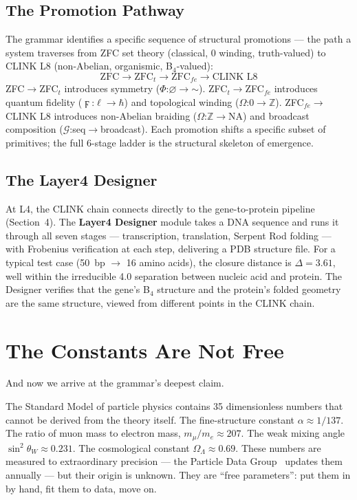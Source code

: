 \documentclass[11pt,a4paper,twocolumn]{article}
\begin{document}
\subsection{The Promotion Pathway}

The grammar identifies a specific sequence of structural promotions — the path a system traverses from ZFC set theory (classical, 0 winding, truth-valued) to CLINK L8 (non-Abelian, organismic, B$_4$-valued):
\begin{equation}
\text{ZFC} \longrightarrow \text{ZFC}_t \longrightarrow \text{ZFC}_{fe} \longrightarrow \text{CLINK L8}
\end{equation}
ZFC$\to$ZFC$_t$ introduces symmetry ($\Phi$:$\varnothing$$\to$$\sim$). ZFC$_t$$\to$ZFC$_{fe}$ introduces quantum fidelity ($\digamma$:$\ell$$\to$$\hbar$) and topological winding ($\Omega$:0$\to$$\mathbb{Z}$). ZFC$_{fe}$$\to$CLINK L8 introduces non-Abelian braiding ($\Omega$:$\mathbb{Z}$$\to$NA) and broadcast composition ($\mathcal{G}$:seq$\to$broadcast). Each promotion shifts a specific subset of primitives; the full 6-stage ladder is the structural skeleton of emergence.

\subsection{The Layer4 Designer}

At L4, the CLINK chain connects directly to the gene-to-protein pipeline (Section~4). The \textbf{Layer4 Designer} module takes a DNA sequence and runs it through all seven stages — transcription, translation, Serpent Rod folding — with Frobenius verification at each step, delivering a PDB structure file. For a typical test case (50~bp $\to$ 16 amino acids), the closure distance is $\Delta = 3.61$, well within the irreducible 4.0 separation between nucleic acid and protein. The Designer verifies that the gene's B$_4$ structure and the protein's folded geometry are the same structure, viewed from different points in the CLINK chain.

\section{The Constants Are Not Free}

And now we arrive at the grammar's deepest claim.

The Standard Model of particle physics contains 35 dimensionless numbers that cannot be derived from the theory itself. The fine-structure constant $\alpha \approx 1/137$. The ratio of muon mass to electron mass, $m_\mu/m_e \approx 207$. The weak mixing angle $\sin^2\theta_W \approx 0.231$. The cosmological constant $\Omega_\Lambda \approx 0.69$. These numbers are measured to extraordinary precision — the Particle Data Group~\cite{pdg2024} updates them annually — but their origin is unknown. They are ``free parameters'': put them in by hand, fit them to data, move on.
\end{document}
